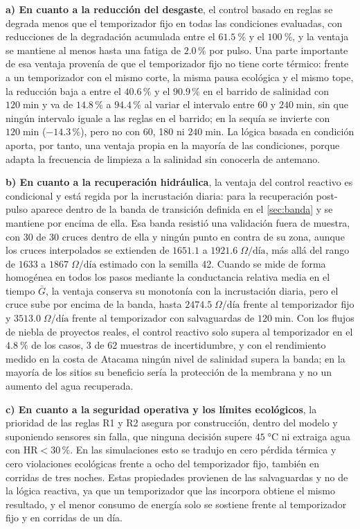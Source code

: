 \textbf{a) En cuanto a la reducci\'on del desgaste}, el control basado en reglas se degrada menos que el temporizador fijo en todas las condiciones evaluadas, con reducciones de la degradaci\'on acumulada entre el $\SI{61.5}{\percent}$ y el $\SI{100}{\percent}$, y la ventaja se mantiene al menos hasta una fatiga de $2.0\,\%$ por pulso. Una parte importante de esa ventaja proven\'ia de que el temporizador fijo no tiene corte t\'ermico: frente a un temporizador con el mismo corte, la misma pausa ecol\'ogica y el mismo tope, la reducci\'on baja a entre el $40.6\,\%$ y el $90.9\,\%$ en el barrido de salinidad con $120\;\text{min}$ y va de $14.8\,\%$ a $94.4\,\%$ al variar el intervalo entre 60 y $240\;\text{min}$, sin que ning\'un intervalo iguale a las reglas en el barrido; en la sequ\'ia se invierte con $120\;\text{min}$ ($-14.3\,\%$), pero no con 60, 180 ni $240\;\text{min}$. La l\'ogica basada en condici\'on aporta, por tanto, una ventaja propia en la mayor\'ia de las condiciones, porque adapta la frecuencia de limpieza a la salinidad sin conocerla de antemano.

\textbf{b) En cuanto a la recuperaci\'on hidr\'aulica}, la ventaja del control reactivo es condicional y est\'a regida por la incrustaci\'on diaria: para la recuperaci\'on post-pulso aparece dentro de la banda de transici\'on definida en el \cref{sec:banda} y se mantiene por encima de ella. Esa banda resisti\'o una validaci\'on fuera de muestra, con 30 de 30 cruces dentro de ella y ning\'un punto en contra de su zona, aunque los cruces interpolados se extienden de $1651.1$ a $1921.6\;\Omega\text{/d\'ia}$, m\'as all\'a del rango de $1633$ a $1867\;\Omega\text{/d\'ia}$ estimado con la semilla 42. Cuando se mide de forma homog\'enea en todos los pasos mediante la conductancia relativa media en el tiempo $\bar{G}$, la ventaja conserva su monoton\'ia con la incrustaci\'on diaria, pero el cruce sube por encima de la banda, hasta $2474.5\;\Omega\text{/d\'ia}$ frente al temporizador fijo y $3513.0\;\Omega\text{/d\'ia}$ frente al temporizador con salvaguardas de $120\;\text{min}$. Con los flujos de niebla de proyectos reales, el control reactivo solo supera al temporizador en el $\SI{4.8}{\percent}$ de los casos, 3 de 62 muestras de incertidumbre, y con el rendimiento medido en la costa de Atacama ning\'un nivel de salinidad supera la banda; en la mayor\'ia de los sitios su beneficio ser\'ia la protecci\'on de la membrana y no un aumento del agua recuperada.

\textbf{c) En cuanto a la seguridad operativa y los l\'imites ecol\'ogicos}, la prioridad de las reglas R1 y R2 asegura por construcci\'on, dentro del modelo y suponiendo sensores sin falla, que ninguna decisi\'on supere $45\;\si{\celsius}$ ni extraiga agua con $\text{HR} < 30\,\%$. En las simulaciones esto se tradujo en cero p\'erdida t\'ermica y cero violaciones ecol\'ogicas frente a ocho del temporizador fijo, tambi\'en en corridas de tres noches. Estas propiedades provienen de las salvaguardas y no de la l\'ogica reactiva, ya que un temporizador que las incorpora obtiene el mismo resultado, y el menor consumo de energ\'ia solo se sostiene frente al temporizador fijo y en corridas de un d\'ia.

